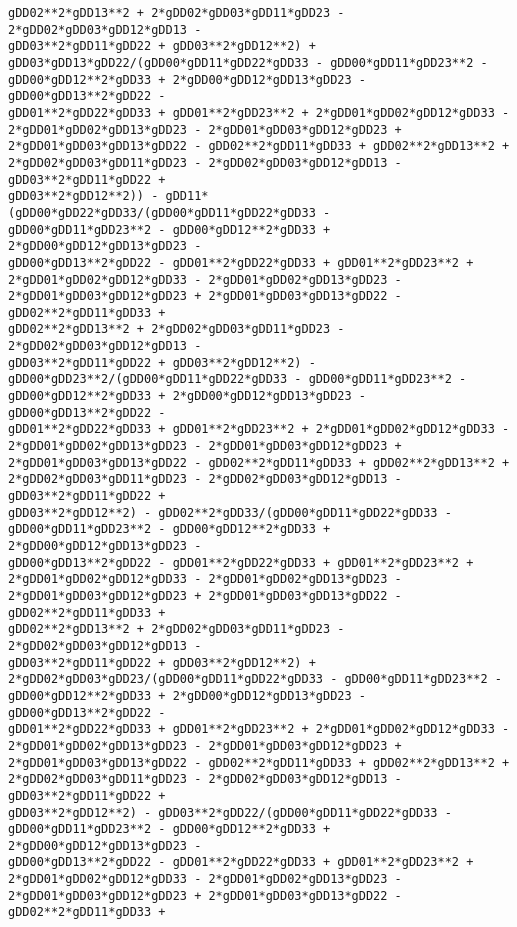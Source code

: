 \documentclass[landscape,letterpaper,10pt,english]{article}
\begin{document}
\begin{Verbatim}[commandchars=\\\{\}]
gDD02**2*gDD13**2 + 2*gDD02*gDD03*gDD11*gDD23 - 2*gDD02*gDD03*gDD12*gDD13 -
gDD03**2*gDD11*gDD22 + gDD03**2*gDD12**2) +
gDD03*gDD13*gDD22/(gDD00*gDD11*gDD22*gDD33 - gDD00*gDD11*gDD23**2 -
gDD00*gDD12**2*gDD33 + 2*gDD00*gDD12*gDD13*gDD23 - gDD00*gDD13**2*gDD22 -
gDD01**2*gDD22*gDD33 + gDD01**2*gDD23**2 + 2*gDD01*gDD02*gDD12*gDD33 -
2*gDD01*gDD02*gDD13*gDD23 - 2*gDD01*gDD03*gDD12*gDD23 +
2*gDD01*gDD03*gDD13*gDD22 - gDD02**2*gDD11*gDD33 + gDD02**2*gDD13**2 +
2*gDD02*gDD03*gDD11*gDD23 - 2*gDD02*gDD03*gDD12*gDD13 - gDD03**2*gDD11*gDD22 +
gDD03**2*gDD12**2)) - gDD11*(gDD00*gDD22*gDD33/(gDD00*gDD11*gDD22*gDD33 -
gDD00*gDD11*gDD23**2 - gDD00*gDD12**2*gDD33 + 2*gDD00*gDD12*gDD13*gDD23 -
gDD00*gDD13**2*gDD22 - gDD01**2*gDD22*gDD33 + gDD01**2*gDD23**2 +
2*gDD01*gDD02*gDD12*gDD33 - 2*gDD01*gDD02*gDD13*gDD23 -
2*gDD01*gDD03*gDD12*gDD23 + 2*gDD01*gDD03*gDD13*gDD22 - gDD02**2*gDD11*gDD33 +
gDD02**2*gDD13**2 + 2*gDD02*gDD03*gDD11*gDD23 - 2*gDD02*gDD03*gDD12*gDD13 -
gDD03**2*gDD11*gDD22 + gDD03**2*gDD12**2) -
gDD00*gDD23**2/(gDD00*gDD11*gDD22*gDD33 - gDD00*gDD11*gDD23**2 -
gDD00*gDD12**2*gDD33 + 2*gDD00*gDD12*gDD13*gDD23 - gDD00*gDD13**2*gDD22 -
gDD01**2*gDD22*gDD33 + gDD01**2*gDD23**2 + 2*gDD01*gDD02*gDD12*gDD33 -
2*gDD01*gDD02*gDD13*gDD23 - 2*gDD01*gDD03*gDD12*gDD23 +
2*gDD01*gDD03*gDD13*gDD22 - gDD02**2*gDD11*gDD33 + gDD02**2*gDD13**2 +
2*gDD02*gDD03*gDD11*gDD23 - 2*gDD02*gDD03*gDD12*gDD13 - gDD03**2*gDD11*gDD22 +
gDD03**2*gDD12**2) - gDD02**2*gDD33/(gDD00*gDD11*gDD22*gDD33 -
gDD00*gDD11*gDD23**2 - gDD00*gDD12**2*gDD33 + 2*gDD00*gDD12*gDD13*gDD23 -
gDD00*gDD13**2*gDD22 - gDD01**2*gDD22*gDD33 + gDD01**2*gDD23**2 +
2*gDD01*gDD02*gDD12*gDD33 - 2*gDD01*gDD02*gDD13*gDD23 -
2*gDD01*gDD03*gDD12*gDD23 + 2*gDD01*gDD03*gDD13*gDD22 - gDD02**2*gDD11*gDD33 +
gDD02**2*gDD13**2 + 2*gDD02*gDD03*gDD11*gDD23 - 2*gDD02*gDD03*gDD12*gDD13 -
gDD03**2*gDD11*gDD22 + gDD03**2*gDD12**2) +
2*gDD02*gDD03*gDD23/(gDD00*gDD11*gDD22*gDD33 - gDD00*gDD11*gDD23**2 -
gDD00*gDD12**2*gDD33 + 2*gDD00*gDD12*gDD13*gDD23 - gDD00*gDD13**2*gDD22 -
gDD01**2*gDD22*gDD33 + gDD01**2*gDD23**2 + 2*gDD01*gDD02*gDD12*gDD33 -
2*gDD01*gDD02*gDD13*gDD23 - 2*gDD01*gDD03*gDD12*gDD23 +
2*gDD01*gDD03*gDD13*gDD22 - gDD02**2*gDD11*gDD33 + gDD02**2*gDD13**2 +
2*gDD02*gDD03*gDD11*gDD23 - 2*gDD02*gDD03*gDD12*gDD13 - gDD03**2*gDD11*gDD22 +
gDD03**2*gDD12**2) - gDD03**2*gDD22/(gDD00*gDD11*gDD22*gDD33 -
gDD00*gDD11*gDD23**2 - gDD00*gDD12**2*gDD33 + 2*gDD00*gDD12*gDD13*gDD23 -
gDD00*gDD13**2*gDD22 - gDD01**2*gDD22*gDD33 + gDD01**2*gDD23**2 +
2*gDD01*gDD02*gDD12*gDD33 - 2*gDD01*gDD02*gDD13*gDD23 -
2*gDD01*gDD03*gDD12*gDD23 + 2*gDD01*gDD03*gDD13*gDD22 - gDD02**2*gDD11*gDD33 +

\end{Verbatim}
\end{document}
